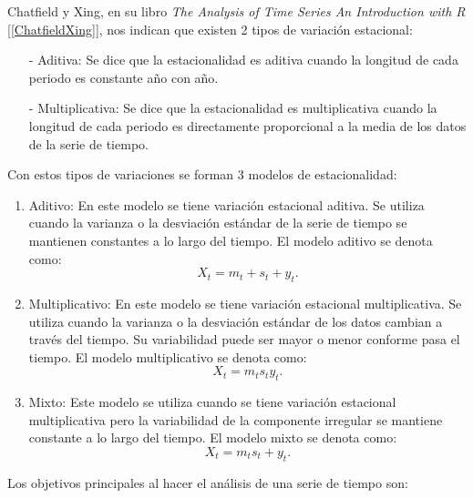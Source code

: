 Chatfield y Xing, en su libro \textit{The Analysis of Time Series An Introduction with R} [\ref{ChatfieldXing}], nos indican que existen 2 tipos de variación estacional:
  
  \begin{itemize}
\item[-] Aditiva: Se dice que la estacionalidad es aditiva cuando la longitud de cada periodo es constante año con año.

\item[-] Multiplicativa: Se dice que la estacionalidad es multiplicativa cuando la longitud de cada periodo es directamente proporcional a la media de los datos de la serie de tiempo.
\end{itemize}

Con estos tipos de variaciones se forman 3 modelos de estacionalidad:
  
  \begin{enumerate}
\item Aditivo: En este modelo se tiene variación estacional aditiva. Se utiliza cuando la varianza o la desviación estándar de la serie de tiempo se mantienen constantes a lo largo del tiempo. El modelo aditivo se denota como:
\begin{equation}
X_{t} = m_{t} + s_{t} + y_{t}.
\end{equation}

\item Multiplicativo: En este modelo se tiene variación estacional multiplicativa. Se utiliza cuando la varianza o la desviación estándar de los datos cambian a través del tiempo. Su variabilidad puede ser mayor o menor conforme pasa el tiempo. El modelo multiplicativo se denota como:
\begin{equation}
X_{t} = m_{t}s_{t}y_{t}.
\end{equation}

\item Mixto: Este modelo se utiliza cuando se tiene variación estacional multiplicativa pero la variabilidad de la componente irregular se mantiene constante a lo largo del tiempo. El modelo mixto se denota como:
\begin{equation}
X_{t} = m_{t}s_{t} + y_{t}.
\end{equation}
\end{enumerate}

Los objetivos principales al hacer el análisis de una serie de tiempo son:
  
